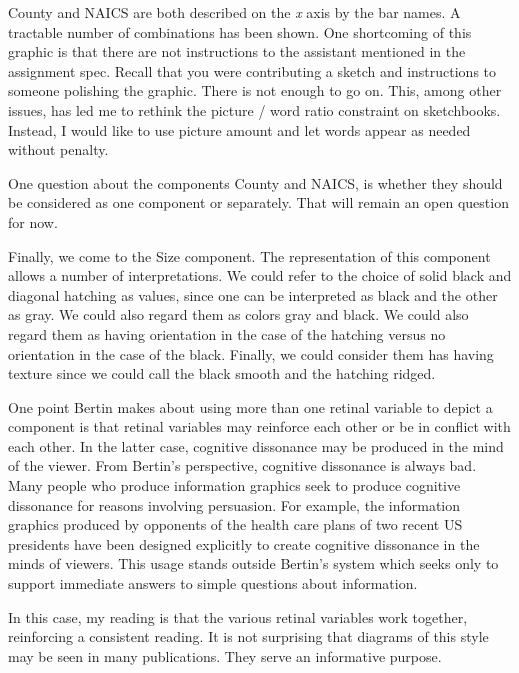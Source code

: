 County and NAICS are both described on the \emph{x} axis by the bar
names. A tractable number of combinations has been shown. One
shortcoming of this graphic is that there are not instructions to the
assistant mentioned in the assignment spec. Recall that you were
contributing a sketch and instructions to someone polishing the graphic.
There is not enough to go on. This, among other issues, has led me to
rethink the picture / word ratio constraint on sketchbooks. Instead, I
would like to use picture amount and let words appear as needed without
penalty.

One question about the components County and NAICS, is whether they
should be considered as one component or separately. That will remain an
open question for now.

Finally, we come to the Size component. The representation of this
component allows a number of interpretations. We could refer to the
choice of solid black and diagonal hatching as values, since one can be
interpreted as black and the other as gray. We could also regard them as
colors gray and black. We could also regard them as having orientation
in the case of the hatching versus no orientation in the case of the
black. Finally, we could consider them has having texture since we could
call the black smooth and the hatching ridged.

One point Bertin makes about using more than one retinal variable to
depict a component is that retinal variables may reinforce each other or
be in conflict with each other. In the latter case, cognitive dissonance
may be produced in the mind of the viewer. From Bertin's perspective,
cognitive dissonance is always bad. Many people who produce information
graphics seek to produce cognitive dissonance for reasons involving
persuasion. For example, the information graphics produced by opponents
of the health care plans of two recent US presidents have been designed
explicitly to create cognitive dissonance in the minds of viewers. This
usage stands outside Bertin's system which seeks only to support
immediate answers to simple questions about information.

In this case, my reading is that the various retinal variables work
together, reinforcing a consistent reading. It is not surprising that
diagrams of this style may be seen in many publications. They serve an
informative purpose.

\hypertarget{visual-design-of-information}{%
\label{visual-design-of-information}}

